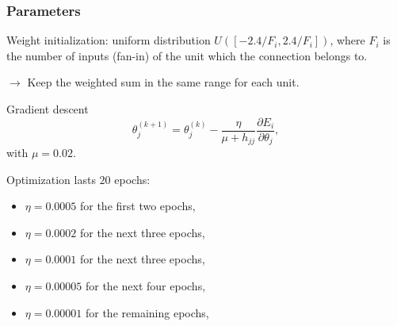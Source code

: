 \begin{frame}
	\frametitle{Parameters}

	Weight initialization: uniform distribution $U([-2.4/F_i, 2.4/F_i])$, where $F_i$ is the number of inputs (fan-in) of the unit which the connection belongs to.

	\smallskip

	$\rightarrow$ Keep the weighted sum in the same range for each unit.

	\bigskip


	\begin{block}{Gradient descent}
	$$
	\theta^{(k+1)}_j = \theta^{(k)}_j - \frac{\eta}{\mu + h_{jj}} \frac{\partial E_i}{\partial \theta_j},
	$$
	with $\mu = 0.02$.
	\end{block}


	\bigskip

	Optimization lasts 	$20$ epochs:
	\begin{itemize}
		\item $\eta = 0.0005$ for the first two epochs,
		\item $\eta = 0.0002$ for the next three epochs,
		\item $\eta = 0.0001$ for the next three epochs,
		\item $\eta = 0.00005$ for the next four epochs,
		\item $\eta = 0.00001$ for the remaining epochs,
	\end{itemize}







\end{frame}




